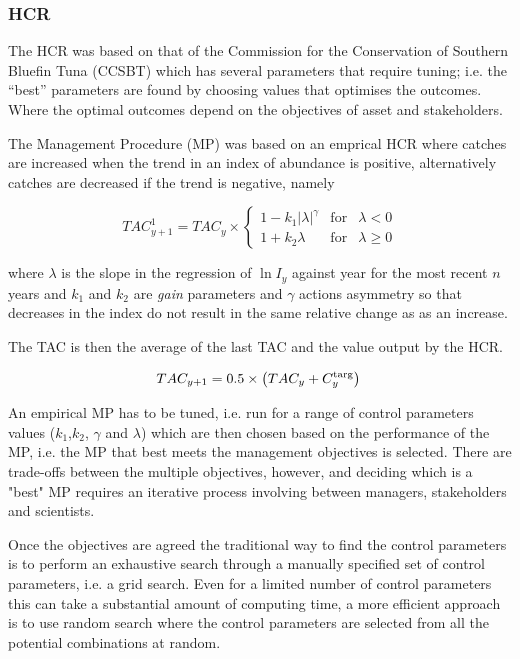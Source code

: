 \documentclass[12pt,doublespacing,a4paper]{ouparticle}
\begin{document}
\subsubsection{HCR}

The HCR was based on that of the Commission for the Conservation of Southern Bluefin Tuna (CCSBT) which has several parameters that require tuning; i.e. the “best” parameters are found by choosing  values that optimises the outcomes. Where the optimal outcomes depend on the objectives of  asset and stakeholders. 

The Management Procedure (MP) was based on an emprical HCR where catches are increased when the trend in an index of abundance is positive, alternatively catches are decreased if the trend is negative, namely 

\begin{equation}
 TAC^1_{y+1}=TAC_y\times 
 \left\{\begin{array}{rcl}  
    {1-k_1|\lambda|^{\gamma}} & \mbox{for} & \lambda<0\\[0.35cm]
    {1+k_2\lambda} & \mbox{for} & \lambda\geq 0 
 \end{array}\right.
\end{equation}

where $\lambda$ is the slope in the regression of $\ln I_y$ against year for the most recent $n$ years and $k_1$ and $k_2$ are \textit{gain} parameters and $\gamma$ actions asymmetry so that decreases in the index do not result in the same relative change as as an increase.

The TAC is then the average of the last TAC and the value output by the HCR. 

\begin{equation} 
     TAC_{y+1} = 0.5\times\left(TAC_y+C^{\rm targ}_y\right)\\
\end{equation}

An empirical MP has to be tuned, i.e. run for a range of control parameters values ($k_1$,$k_2$, $\gamma$ and $\lambda$) which are then chosen based on the performance of the MP, i.e. the MP that best meets the management objectives is selected. There are trade-offs between the multiple objectives, however, and  deciding which is a "best" MP requires an iterative process involving between managers, stakeholders and scientists.  

Once the objectives are agreed the traditional way to find the control parameters is to perform an exhaustive search through a manually specified set of control parameters, i.e. a grid search. Even for a limited number of control parameters this can take a substantial amount of computing time, a more efficient approach is to use random search where the control parameters are selected from all the potential combinations at random.
\end{document}
